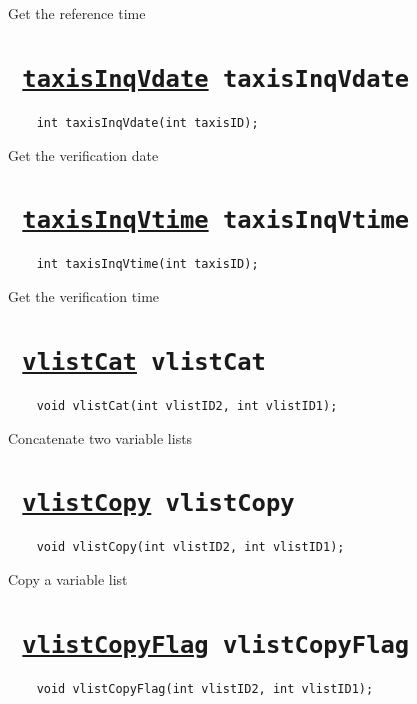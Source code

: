 Get the reference time
\ifpdfoutput{}{(\ref{taxisInqRtime})}


\section*{\texttt{ 
\ifpdf
\hyperref[taxisInqVdate]{taxisInqVdate}
\else
taxisInqVdate
\fi
}}
\begin{verbatim}
    int taxisInqVdate(int taxisID);
\end{verbatim}

Get the verification date
\ifpdfoutput{}{(\ref{taxisInqVdate})}


\section*{\texttt{ 
\ifpdf
\hyperref[taxisInqVtime]{taxisInqVtime}
\else
taxisInqVtime
\fi
}}
\begin{verbatim}
    int taxisInqVtime(int taxisID);
\end{verbatim}

Get the verification time
\ifpdfoutput{}{(\ref{taxisInqVtime})}


\section*{\texttt{ 
\ifpdf
\hyperref[vlistCat]{vlistCat}
\else
vlistCat
\fi
}}
\begin{verbatim}
    void vlistCat(int vlistID2, int vlistID1);
\end{verbatim}

Concatenate two variable lists
\ifpdfoutput{}{(\ref{vlistCat})}


\section*{\texttt{ 
\ifpdf
\hyperref[vlistCopy]{vlistCopy}
\else
vlistCopy
\fi
}}
\begin{verbatim}
    void vlistCopy(int vlistID2, int vlistID1);
\end{verbatim}

Copy a variable list
\ifpdfoutput{}{(\ref{vlistCopy})}


\section*{\texttt{ 
\ifpdf
\hyperref[vlistCopyFlag]{vlistCopyFlag}
\else
vlistCopyFlag
\fi
}}
\begin{verbatim}
    void vlistCopyFlag(int vlistID2, int vlistID1);
\end{verbatim}

